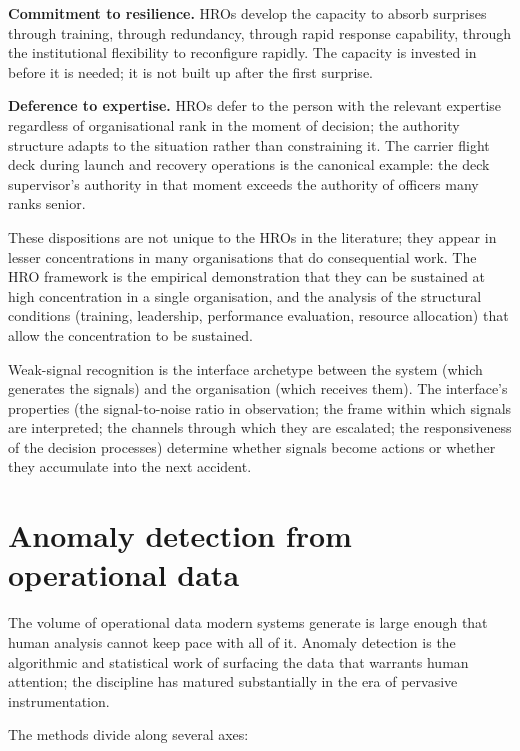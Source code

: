\textbf{Commitment to resilience.} HROs develop the capacity to absorb surprises through training, through redundancy, through rapid response capability, through the institutional flexibility to reconfigure rapidly. The capacity is invested in before it is needed; it is not built up after the first surprise.

\textbf{Deference to expertise.} HROs defer to the person with the relevant expertise regardless of organisational rank in the moment of decision; the authority structure adapts to the situation rather than constraining it. The carrier flight deck during launch and recovery operations is the canonical example: the deck supervisor's authority in that moment exceeds the authority of officers many ranks senior.

These dispositions are not unique to the HROs in the literature; they appear in lesser concentrations in many organisations that do consequential work. The HRO framework is the empirical demonstration that they can be sustained at high concentration in a single organisation, and the analysis of the structural conditions (training, leadership, performance evaluation, resource allocation) that allow the concentration to be sustained.

\begin{archetype}[interface]
Weak-signal recognition is the interface archetype between the system (which generates the signals) and the organisation (which receives them). The interface's properties (the signal-to-noise ratio in observation; the frame within which signals are interpreted; the channels through which they are escalated; the responsiveness of the decision processes) determine whether signals become actions or whether they accumulate into the next accident.
\end{archetype}

\section{Anomaly detection from operational data}

The volume of operational data modern systems generate is large enough that human analysis cannot keep pace with all of it. Anomaly detection is the algorithmic and statistical work of surfacing the data that warrants human attention; the discipline has matured substantially in the era of pervasive instrumentation.

The methods divide along several axes:


